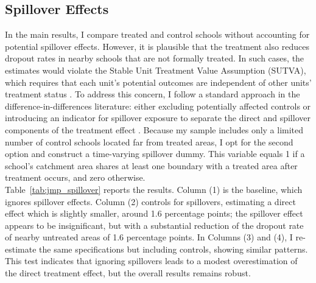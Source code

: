 \documentclass[12pt]{article}
\theoremstyle{plain}
\theoremstyle{plain}
\theoremstyle{plain}
\theoremstyle{definition}
\theoremstyle{plain}
\theoremstyle{definition}
\theoremstyle{plain}
\theoremstyle{remark}
\theoremstyle{definition}
\theoremstyle{definition}
\theoremstyle{plain}
\begin{document}
\subsection{Spillover Effects}
\label{sec:jmp_spillovers}
In the main results, I compare treated and control schools without accounting for potential spillover effects. However, it is plausible that the treatment also reduces dropout rates in nearby schools that are not formally treated. In such cases, the estimates would violate the Stable Unit Treatment Value Assumption (SUTVA), which requires that each unit’s potential outcomes are independent of other units’ treatment status \citep{cunningham_causal_2021}. To address this concern, I follow a standard approach in the difference-in-differences literature: either excluding potentially affected controls or introducing an indicator for spillover exposure to separate the direct and spillover components of the treatment effect \citep{kline_local_2014, butts_difference--differences_2023}. Because my sample includes only a limited number of control schools located far from treated areas, I opt for the second option and construct a time-varying spillover dummy. This variable equals 1 if a school’s catchment area shares at least one boundary with a treated area after treatment occurs, and zero otherwise. \\
Table~\ref{tab:jmp_spillover} reports the results. Column (1) is the baseline, which ignores spillover effects. Column (2) controls for spillovers, estimating a direct effect which is slightly smaller, around 1.6 percentage points; the spillover effect appears to be insignificant, but with a substantial reduction of the dropout rate of nearby untreated areas of 1.6 percentage points. In Columns (3) and (4), I re-estimate the same specifications but including controls, showing similar patterns. This test indicates that ignoring spillovers leads to a modest overestimation of the direct treatment effect, but the overall results remains robust. \par    
\end{document}
